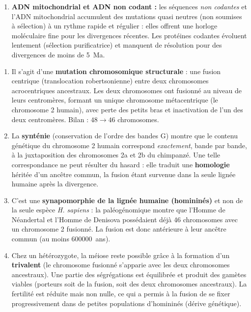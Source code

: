 \documentclass[11pt]{article}
\newcommand{\cle}[1]{{\popxbold\color{popdark}#1}}
\begin{document}
\begin{corrige}
\begin{enumerate}
    \item \textbf{ADN mitochondrial et ADN non codant :} les séquences \emph{non codantes} et l'ADN mitochondrial accumulent des mutations quasi neutres (non soumises à sélection) à un rythme rapide et régulier : elles offrent une \cle{horloge moléculaire} fine pour les divergences récentes. Les protéines codantes évoluent lentement (sélection purificatrice) et manquent de résolution pour des divergences de moins de \SI{5}{Ma}.
\end{enumerate}
\end{corrige}

\begin{corrige}
\begin{enumerate}
    \item Il s'agit d'une \textbf{mutation chromosomique structurale} : une \cle{fusion centrique} (translocation robertsonienne) entre deux chromosomes acrocentriques ancestraux. Les deux chromosomes ont fusionné au niveau de leurs centromères, formant un unique chromosome métacentrique (le chromosome 2 humain), avec perte des petits bras et inactivation de l'un des deux centromères. Bilan : $48 \rightarrow 46$ chromosomes.
    \item La \textbf{synténie} (conservation de l'ordre des bandes G) montre que le contenu génétique du chromosome 2 humain correspond \emph{exactement}, bande par bande, à la juxtaposition des chromosomes 2a et 2b du chimpanzé. Une telle correspondance ne peut résulter du hasard : elle traduit une \textbf{homologie} héritée d'un ancêtre commun, la fusion étant survenue dans la seule lignée humaine après la divergence.
    \item C'est une \textbf{synapomorphie de la lignée humaine (homininés)} et non de la seule espèce \emph{H. sapiens} : la paléogénomique montre que l'Homme de Néandertal et l'Homme de Denisova possédaient déjà 46 chromosomes avec un chromosome 2 fusionné. La fusion est donc antérieure à leur ancêtre commun (au moins \SI{600000}{ans}).
    \item Chez un hétérozygote, la méiose reste possible grâce à la formation d'un \textbf{trivalent} (le chromosome fusionné s'apparie avec les deux chromosomes ancestraux). Une partie des ségrégations est équilibrée et produit des gamètes viables (porteurs soit de la fusion, soit des deux chromosomes ancestraux). La fertilité est réduite mais non nulle, ce qui a permis à la fusion de se fixer progressivement dans de petites populations d'homininés (dérive génétique).
\end{enumerate}
\end{corrige}
\end{document}
